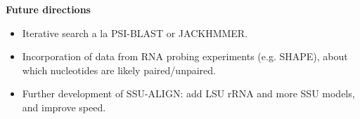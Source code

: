 \documentclass[landscape]{slides}
\begin{document}
\begin{slide}
\begin{center}

\large
\textbf{Future directions}
\end{center}
\medskip

\normalsize
\begin{itemize}
\item Iterative search a la PSI-BLAST or JACKHMMER.
\end{itemize}
\begin{itemize}
\item Incorporation of data from RNA probing experiments (e.g. SHAPE),
  about which nucleotides are likely paired/unpaired.
\end{itemize}
\begin{itemize}
\item Further development of SSU-ALIGN: add LSU rRNA and more SSU models, and improve speed.
\end{itemize}

\vfill 
\end{slide}
\end{document}
